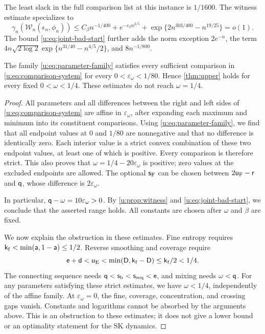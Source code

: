 The least slack in the full comparison list at this instance is
$1/1600$. The witness estimate specializes to
\begin{equation}\label{u:eq:witness-instance}
 \gamma_n(\mathcal W_n(\epsilon_n,\phi_n))
 \le C_\beta n^{-1/400}+e^{-c_\beta n^{2/5}}
       +\exp\{2n^{303/400}-n^{19/25}\}=o(1).
\end{equation}
The bound \eqref{u:eq:joint-bad-start} further adds the norm exception
$2e^{-n}$, the term
$4n\sqrt{2\log2}\exp\{n^{31/40}-n^{4/5}/2\}$, and
$8n^{-1/800}$.

\begin{proposition}\label{u:prop:range}
The family \eqref{u:eq:parameter-family} satisfies every sufficient
comparison in \eqref{u:eq:comparison-system} for every
$0<\varepsilon_\omega<1/80$. Hence \cref{thm:upper} holds for every
fixed $0<\omega<1/4$. These estimates do not reach $\omega=1/4$.
\end{proposition}

\begin{proof}
All parameters and all differences between the right and left sides
of \eqref{u:eq:comparison-system} are affine in $\varepsilon_\omega$,
after expanding each maximum and minimum into its constituent
comparisons. Using \eqref{u:eq:parameter-family}, we find that all endpoint values
at $0$ and $1/80$ are nonnegative and that no difference is identically
zero. Each interior value is a strict convex combination of these two
endpoint values, at least one of which is positive. Every comparison
is therefore strict. This also proves that
$\omega=1/4-20\varepsilon_\omega$ is positive; zero values at the excluded
endpoints are allowed. The optional $\mathsf{s}_{\rm F}$ can be chosen
between $2\mathsf{u}_{\rm F}-\mathsf{r}$ and $\mathsf{q}$, whose difference is
$2\varepsilon_\omega$.

In particular, $\mathsf{q}-\omega=10\varepsilon_\omega>0$.
By \cref{u:prop:witness} and \eqref{u:eq:joint-bad-start}, we conclude
that the asserted range holds. All constants
are chosen after $\omega$ and $\beta$ are fixed.

We now explain the obstruction in these estimates. Fine entropy requires
$\mathsf{k}_{\rm f}<\min(\mathsf{a},1-\mathsf{a})\le1/2$.
Reverse smoothing and coverage require
\[
 \mathsf{e}+\mathsf{d}<\mathsf{u}_{\rm E}
 <\min(\mathsf{D},\mathsf{k}_{\rm f}-\mathsf{D})
 \le\mathsf{k}_{\rm f}/2<1/4.
\]
The connecting sequence needs
$\mathsf{q}<\mathsf{s}_{\rm b}<\mathsf{s}_{\rm seq}<\mathsf{e}$, and mixing needs
$\omega<\mathsf{q}$. For any parameters satisfying these strict estimates,
we have $\omega<1/4$, independently of the affine family.
At $\varepsilon_\omega=0$, the fine, coverage, concentration, and
crossing gaps vanish. Constants and logarithms cannot be absorbed by
the arguments above. This is an obstruction to these estimates; it
does not give a lower bound or an optimality statement for the SK
dynamics.
\end{proof}

